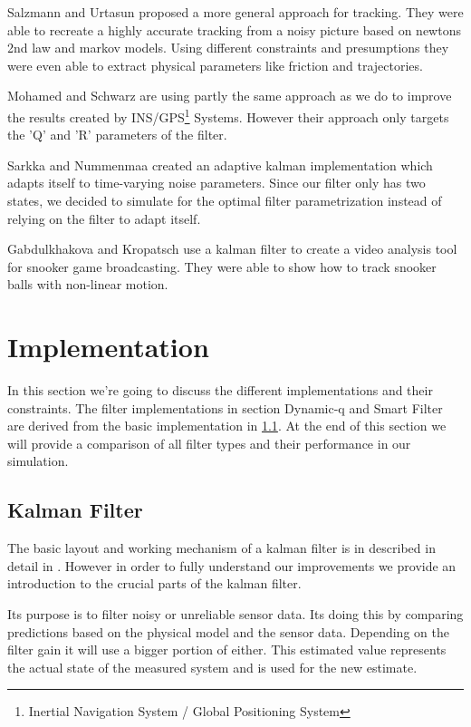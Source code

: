 \documentclass[notitlepage, a4paper, 11pt]{scrartcl}
\begin{document}
\begin{multicols}{2}
Salzmann and Urtasun \cite{salzmann} proposed a more general approach for tracking. 
They were able to recreate a highly accurate tracking from a noisy picture based on newtons 2nd law and markov models.
Using different constraints and presumptions they were even able to extract physical parameters like friction and trajectories.

Mohamed and Schwarz \cite{schwarz} are using partly the same approach as we do to improve the results created by INS/GPS\footnote{Inertial Navigation System / Global Positioning System} Systems.
However their approach only targets the 'Q' and 'R' parameters of the filter.

Sarkka and Nummenmaa \cite{sarkka} created an adaptive kalman implementation which adapts itself to time-varying noise parameters. 
Since our filter only has two states, we decided to simulate for the optimal filter parametrization instead of relying on the filter to adapt itself.

Gabdulkhakova and Kropatsch \cite{kropatsch} use a kalman filter to create a video analysis tool for snooker game broadcasting.
They were able to show how to track snooker balls with non-linear motion.

\section{Implementation} \label{implementation}
In this section we're going to discuss the different implementations and their constraints. The filter implementations in section Dynamic-q and Smart Filter are derived from
the basic implementation in \cref{kalman-basic}. At the end of this section we will provide a comparison of all filter types and their performance in our simulation.

\subsection{Kalman Filter} \label{kalman-basic}

The basic layout and working mechanism of a kalman filter is in described in detail in \cite{kalman}. 
However in order to fully understand our improvements we provide an introduction to the crucial parts of the kalman filter.

Its purpose is to filter noisy or unreliable sensor data. 
Its doing this by comparing predictions based on the physical model and the sensor data. 
Depending on the filter gain it will use a bigger portion of either. 
This estimated value represents the actual state of the measured system and is used for the new estimate.


\end{multicols}
\end{document}

